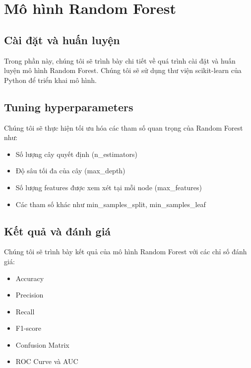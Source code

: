 \section{Mô hình Random Forest}

\subsection{Cài đặt và huấn luyện}
Trong phần này, chúng tôi sẽ trình bày chi tiết về quá trình cài đặt và huấn luyện mô hình Random Forest. Chúng tôi sẽ sử dụng thư viện scikit-learn của Python để triển khai mô hình.

\subsection{Tuning hyperparameters}
Chúng tôi sẽ thực hiện tối ưu hóa các tham số quan trọng của Random Forest như:
\begin{itemize}
    \item Số lượng cây quyết định (n\_estimators)
    \item Độ sâu tối đa của cây (max\_depth)
    \item Số lượng features được xem xét tại mỗi node (max\_features)
    \item Các tham số khác như min\_samples\_split, min\_samples\_leaf
\end{itemize}

\subsection{Kết quả và đánh giá}
Chúng tôi sẽ trình bày kết quả của mô hình Random Forest với các chỉ số đánh giá:
\begin{itemize}
    \item Accuracy
    \item Precision
    \item Recall
    \item F1-score
    \item Confusion Matrix
    \item ROC Curve và AUC
\end{itemize}